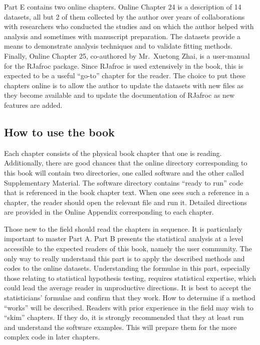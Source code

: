 \documentclass[
]{book}
\begin{document}
Part E contains two online chapters. Online Chapter 24 is a description of 14 datasets, all but 2 of them collected by the author over years of collaborations with researchers who conducted the studies and on which the author helped with analysis and sometimes with manuscript preparation. The datasets provide a means to demonstrate analysis techniques and to validate fitting methods. Finally, Online Chapter 25, co-authored by Mr.~Xuetong Zhai, is a user-manual for the RJafroc package. Since RJafroc is used extensively in the book, this is expected to be a useful ``go-to'' chapter for the reader. The choice to put these chapters online is to allow the author to update the datasets with new files as they become available and to update the documentation of RJafroc as new features are added.

\hypertarget{how-to-use-the-book}{%
\subsection{How to use the book}\label{how-to-use-the-book}}

Each chapter consists of the physical book chapter that one is reading. Additionally, there are good chances that the online directory corresponding to this book will contain two directories, one called software and the other called Supplementary Material. The software directory contains ``ready to run'' code that is referenced in the book chapter text. When one sees such a reference in a chapter, the reader should open the relevant file and run it. Detailed directions are provided in the Online Appendix corresponding to each chapter.

Those new to the field should read the chapters in sequence. It is particularly important to master Part A. Part B presents the statistical analysis at a level accessible to the expected readers of this book, namely the user community. The only way to really understand this part is to apply the described methods and codes to the online datasets. Understanding the formulae in this part, especially those relating to statistical hypothesis testing, requires statistical expertise, which could lead the average reader in unproductive directions. It is best to accept the statisticians' formulae and confirm that they work. How to determine if a method ``works'' will be described. Readers with prior experience in the field may wish to ``skim'' chapters. If they do, it is strongly recommended that they at least run and understand the software examples. This will prepare them for the more complex code in later chapters.
\end{document}
